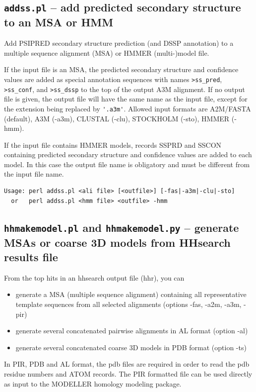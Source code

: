 \documentclass[11pt,a4paper]{article}
\begin{document}
\subsection{{\tt addss.pl} -- add predicted secondary structure to an MSA or HMM}
Add PSIPRED secondary structure prediction (and DSSP annotation) to a multiple sequence alignment (MSA) 
or HMMER (multi-)model file. 

If the input file is an MSA, the predicted secondary structure and confidence values are added as 
special annotation sequences with names \verb`>ss_pred`, \verb`>ss_conf`, and \verb`>ss_dssp` to the top of the output 
A3M alignment. If no output file is given, the output file will have the same name as the input file, 
except for the extension being replaced by \verb`'.a3m'`. Allowed input formats are A2M/FASTA (default), 
A3M (-a3m), CLUSTAL (-clu), STOCKHOLM (-sto), HMMER (-hmm).

If the input file contains HMMER models, records SSPRD and SSCON containing predicted secondary 
structure and confidence values are added to each model. In this case the output file name is 
obligatory and must be different from the input file name.

\small 
\begin{verbatim}
Usage: perl addss.pl <ali file> [<outfile>] [-fas|-a3m|-clu|-sto]  
  or   perl addss.pl <hmm file> <outfile> -hmm  
\end{verbatim} 
\normalsize


\subsection{{\tt hhmakemodel.pl} and {\tt hhmakemodel.py} -- generate MSAs or coarse 3D models from HHsearch results file}

From the top hits in an hhsearch output file (hhr), you can  
\begin{itemize}
\item{generate a MSA (multiple sequence alignment) containing all representative 
template sequences from all selected alignments (options -fas, -a2m, -a3m, -pir)}
\item{generate several concatenated pairwise alignments in AL format (option -al)}
\item{generate several concatenated coarse 3D models in PDB format (option -ts)}
\end{itemize}
In PIR, PDB and AL format, the pdb files are required in order to read the pdb residue numbers 
and ATOM records. The PIR formatted file can be used directly as input to the MODELLER\cite{Sali:1993} 
homology modeling package.
\end{document}
